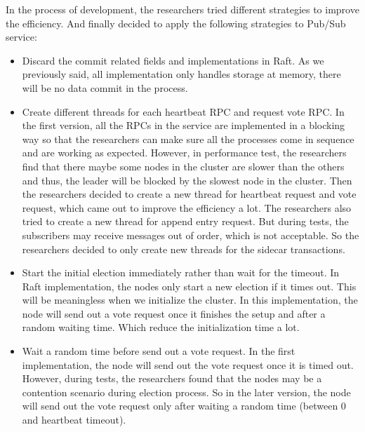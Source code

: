 In the process of development, the researchers tried different strategies to improve the efficiency. And finally decided to apply the following strategies to Pub/Sub service:

\begin{itemize}
  \item Discard the commit related fields and implementations in Raft. As we previously said, all implementation only handles storage at memory, there will be no data commit in the process.
  \item Create different threads for each heartbeat RPC and request vote RPC. In the first version, all the RPCs in the service are implemented in a blocking way so that the researchers can make sure all the processes come in sequence and are working as expected. However, in performance test, the researchers find that there maybe some nodes in the cluster are slower than the others and thus, the leader will be blocked by the slowest node in the cluster. Then the researchers decided to create a new thread for heartbeat request and vote request, which came out to improve the efficiency a lot. The researchers also tried to create a new thread for append entry request. But during tests, the subscribers may receive messages out of order, which is not acceptable. So the researchers decided to only create new threads for the sidecar transactions.
  \item Start the initial election immediately rather than wait for the timeout. In Raft implementation, the nodes only start a new election if it times out. This will be meaningless when we initialize the cluster. In this implementation, the node will send out a vote request once it finishes the setup and after a random waiting time. Which reduce the initialization time a lot.
  \item Wait a random time before send out a vote request. In the first implementation, the node will send out the vote request once it is timed out. However, during tests, the researchers found that the nodes may be a contention scenario during election process. So in the later version, the node will send out the vote request only after waiting a random time (between 0 and heartbeat timeout).
\end{itemize}